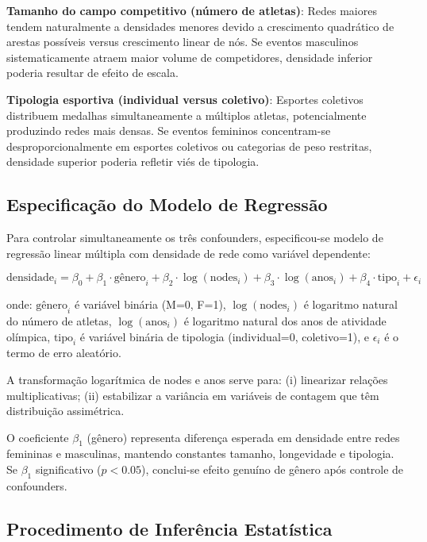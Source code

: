 \textbf{Tamanho do campo competitivo (número de atletas)}: Redes maiores tendem naturalmente a densidades menores devido a crescimento quadrático de arestas possíveis versus crescimento linear de nós. Se eventos masculinos sistematicamente atraem maior volume de competidores, densidade inferior poderia resultar de efeito de escala.

\textbf{Tipologia esportiva (individual versus coletivo)}: Esportes coletivos distribuem medalhas simultaneamente a múltiplos atletas, potencialmente produzindo redes mais densas. Se eventos femininos concentram-se desproporcionalmente em esportes coletivos ou categorias de peso restritas, densidade superior poderia refletir viés de tipologia.

\subsection{Especificação do Modelo de Regressão}

Para controlar simultaneamente os três confounders, especificou-se modelo de regressão linear múltipla com densidade de rede como variável dependente:

\begin{equation}
\text{densidade}_i = \beta_0 + \beta_1 \cdot \text{gênero}_i + \beta_2 \cdot \log(\text{nodes}_i) + \beta_3 \cdot \log(\text{anos}_i) + \beta_4 \cdot \text{tipo}_i + \epsilon_i
\label{eq:density_regression}
\end{equation}

\noindent onde: $\text{gênero}_i$ é variável binária (M=0, F=1), $\log(\text{nodes}_i)$ é logaritmo natural do número de atletas, $\log(\text{anos}_i)$ é logaritmo natural dos anos de atividade olímpica, $\text{tipo}_i$ é variável binária de tipologia (individual=0, coletivo=1), e $\epsilon_i$ é o termo de erro aleatório.

A transformação logarítmica de nodes e anos serve para: (i) linearizar relações multiplicativas; (ii) estabilizar a variância em variáveis de contagem que têm distribuição assimétrica.

O coeficiente $\beta_1$ (gênero) representa diferença esperada em densidade entre redes femininas e masculinas, mantendo constantes tamanho, longevidade e tipologia. Se $\beta_1$ significativo ($p < 0.05$), conclui-se efeito genuíno de gênero após controle de confounders.

\subsection{Procedimento de Inferência Estatística}

